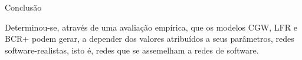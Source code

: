 % 
% 

\begin{section}{Conclusão}
	
	Determinou-se, através de uma avaliação empírica, que os modelos CGW, LFR e BCR+ podem gerar, a depender dos valores atribuídos a seus parâmetros, redes software-realistas, isto é, redes que se assemelham a redes de software. 
	
	
\end{section}
 
